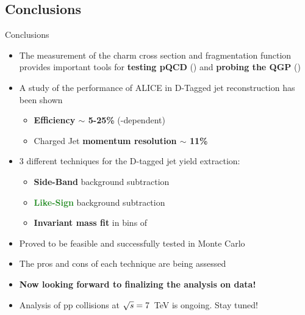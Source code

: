 \documentclass[xcolor={usenames,dvipsnames}]{beamer}
\begin{document}
\subsection*{Conclusions}
\begin{frame}{Conclusions}
\begin{itemize}
\item The measurement of the charm cross section and fragmentation function provides important tools for
\textbf{\alert{testing pQCD}} (\pp) and \textbf{\alert{probing the QGP}} (\PbPb)
\item A study of the performance of ALICE in D-Tagged jet reconstruction has been shown
\begin{itemize}
\item \textbf{Efficiency $\sim$ 5-25\%} (\ptd-dependent)
\item Charged Jet \textbf{momentum resolution $\sim$ 11\%}
\end{itemize}
\item 3 different techniques for the D-tagged jet yield extraction:
\begin{itemize}
\item \textbf{\textcolor{BrickRed}{Side-Band}} background subtraction
\item \textbf{\textcolor{ForestGreen}{Like-Sign}} background subtraction
\item \textbf{\textcolor{NavyBlue}{Invariant mass fit}} in bins of \ptchjet
\end{itemize}
\item Proved to be \alert{feasible} and \alert{successfully tested} in Monte Carlo
\item The pros and cons of each technique are being assessed
\item \textbf{\alert{Now looking forward to finalizing the analysis on data!}}
\item Analysis of pp collisions at $\sqrt{s}=7$~TeV is ongoing. Stay tuned!
\end{itemize}
\end{frame}


\end{document}
